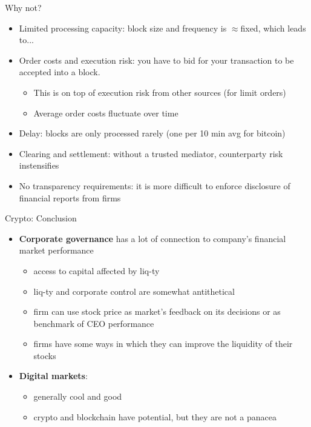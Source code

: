\documentclass[english,10pt
,aspectratio=169
]{beamer}
\begin{document}
\begin{frame}[label=problems]{Why not?}
	\begin{itemize}
		\item \alert{Limited processing capacity}: block size and frequency is $\approx$fixed, which leads to...
		\item \alert{Order costs} and \alert{execution risk}: you have to bid for your transaction to be accepted into a block.
		\begin{itemize}
			\item This is on top of execution risk from other sources (for limit orders)
			\item Average order costs fluctuate over time \hyperlink{problems}{}
		\end{itemize}
		\item \alert{Delay}: blocks are only processed rarely (one per 10 min avg for bitcoin)
		\item \alert{Clearing and settlement}: without a trusted mediator, counterparty risk instensifies
		\item \alert{No transparency requirements}: it is more difficult to enforce disclosure of financial reports from firms
	\end{itemize}
\end{frame}


\begin{frame}{Crypto: Conclusion}
	\begin{itemize}
		\item \textbf{Corporate governance} has a lot of connection to company's financial market performance
		\begin{itemize}
			\item access to capital affected by liq-ty
			\item liq-ty and corporate control are somewhat antithetical
			\item firm can use stock price as market's feedback on its decisions or as benchmark of CEO performance
			\item firms have some ways in which they can improve the liquidity of their stocks
		\end{itemize}
		\item \textbf{Digital markets}:
		\begin{itemize}
			\item generally cool and good
			\item crypto and blockchain have potential, but they are not a panacea
		\end{itemize}
	\end{itemize}
\end{frame}
\end{document}
